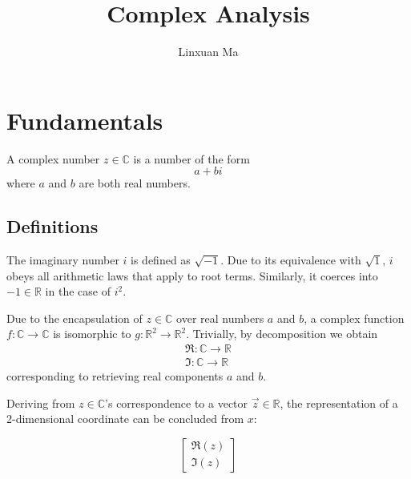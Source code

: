 \documentclass[12pt]{article}
\title{Complex Analysis}
\author{Linxuan Ma}
\begin{document}
	\maketitle
	
	\newcommand{\mo}[1]{\lvert #1 \rvert}
	\newcommand{\mos}[1]{\lvert #1 \rvert^2}
	\newcommand{\RR}{\mathbb{R}}
	
	
	\section{Fundamentals}
	A complex number $z \in \mathbb{C}$ is a number of the form $$a + bi$$ where $a$ and $b$ are both real numbers.
	
	\subsection{Definitions}
	The imaginary number $i$ is defined as $\sqrt{-1}$. Due to its equivalence with $\sqrt{1}$, $i$ obeys all arithmetic laws that apply to root terms. Similarly, it coerces into $-1 \in \RR$ in the case of $i^2$.
	
	Due to the encapsulation of $z \in \mathbb{C}$ over real numbers $a$ and $b$, a complex function $f: \mathbb{C} \to \mathbb{C}$ is isomorphic to $g: \RR^2 \to \RR^2$. Trivially, by decomposition we obtain
	\begin{gather*}
		\Re: \mathbb{C} \to \RR \\
		\Im: \mathbb{C} \to \RR
	\end{gather*}
	corresponding to retrieving real components $a$ and $b$.
	
	Deriving from $z \in \mathbb{C}$'s correspondence to a vector $\vec{z} \in \RR$, the representation of a 2-dimensional coordinate can be concluded from $x$:
	
	\begin{equation*}
		\begin{bmatrix}
			\Re(z) \\ \Im(z)
		\end{bmatrix}
	\end{equation*}
	
\end{document}
